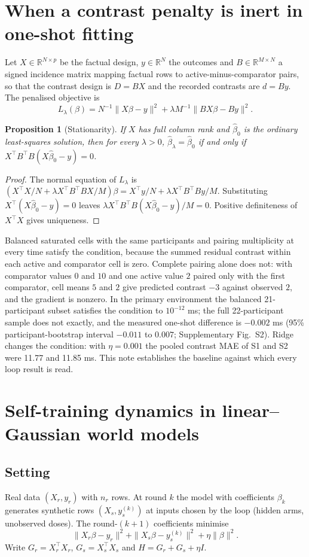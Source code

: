 \documentclass[11pt,a4paper]{article}
\newtheorem{proposition}{Proposition}[section]
\begin{document}
\section{When a contrast penalty is inert in one-shot fitting}
Let $X\in\mathbb R^{N\times p}$ be the factual design, $y\in\mathbb R^N$ the outcomes and $B\in\mathbb R^{M\times N}$ a signed incidence matrix mapping factual rows to active-minus-comparator pairs, so that the contrast design is $D=BX$ and the recorded contrasts are $d=By$. The penalised objective is
\begin{equation}
L_\lambda(\beta)=N^{-1}\|X\beta-y\|^2+\lambda M^{-1}\|BX\beta-By\|^2 .
\end{equation}
\begin{proposition}[Stationarity]
If $X$ has full column rank and $\hat\beta_0$ is the ordinary least-squares solution, then for every $\lambda>0$, $\hat\beta_\lambda=\hat\beta_0$ if and only if $X^\top B^\top B(X\hat\beta_0-y)=0$.
\end{proposition}
\begin{proof}
The normal equation of $L_\lambda$ is $(X^\top X/N+\lambda X^\top B^\top BX/M)\beta=X^\top y/N+\lambda X^\top B^\top By/M$. Substituting $X^\top(X\hat\beta_0-y)=0$ leaves $\lambda X^\top B^\top B(X\hat\beta_0-y)/M=0$. Positive definiteness of $X^\top X$ gives uniqueness.
\end{proof}
Balanced saturated cells with the same participants and pairing multiplicity at every time satisfy the condition, because the summed residual contrast within each active and comparator cell is zero. Complete pairing alone does not: with comparator values $0$ and $10$ and one active value $2$ paired only with the first comparator, cell means $5$ and $2$ give predicted contrast $-3$ against observed $2$, and the gradient is nonzero. In the primary environment the balanced 21-participant subset satisfies the condition to $10^{-12}$ ms; the full 22-participant sample does not exactly, and the measured one-shot difference is $-0.002$ ms (95\% participant-bootstrap interval $-0.011$ to $0.007$; Supplementary Fig.~S2). Ridge changes the condition: with $\eta=0.001$ the pooled contrast MAE of S1 and S2 were 11.77 and 11.85 ms. This note establishes the baseline against which every loop result is read.

\section{Self-training dynamics in linear--Gaussian world models}
\subsection{Setting}
Real data $(X_r,y_r)$ with $n_r$ rows. At round $k$ the model with coefficients $\beta_k$ generates synthetic rows $(X_s,y_s^{(k)})$ at inputs chosen by the loop (hidden arms, unobserved doses). The round-$(k{+}1)$ coefficients minimise
\begin{equation}
\|X_r\beta-y_r\|^2+\|X_s\beta-y_s^{(k)}\|^2+\eta\|\beta\|^2 .
\end{equation}
Write $G_r=X_r^\top X_r$, $G_s=X_s^\top X_s$ and $H=G_r+G_s+\eta I$.
\end{document}
